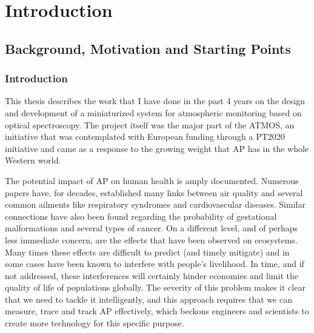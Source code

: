 \chapter{Introduction}%
\label{cha:introduction}

\section{Background, Motivation and Starting Points}%
\label{sec:background_and_motivation}

\subsection{Introduction}%
\label{sub:introduction}

This thesis describes the work that I have done in the past 4 years on
the design and development of a miniaturized system for atmospheric
monitoring based on optical spectroscopy. The project itself was the
major part of the \gls{ATMOS}, an initiative that was
contemplated with European funding through a \gls{PT2020} initiative and
came as a response to the growing weight that \gls{AP} has in the whole
Western world.

The potential impact of \gls{AP} on human health is amply documented.
Numerous papers have, for decades, established many links between air
quality and several common ailments like respiratory syndromes and
cardiovascular diseases. Similar connections have also been found
regarding the probability of gestational malformations and several types
of cancer. On a different level, and of perhaps less immediate concern,
are the effects that have been observed on ecosystems. Many times these
effects are difficult to predict (and timely mitigate) and in some cases
have been known to interfere with people's livelihood. In time, and if
not addressed, these interferences will certainly hinder economies and
limit the quality of life of populations globally. The severity of this
problem makes it clear that we need to tackle it intelligently, and this
approach requires that we can measure, trace and track \gls{AP}
effectively, which beckons engineers and scientists to create more
technology for this specific purpose.

